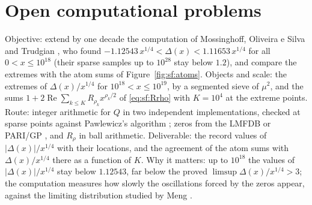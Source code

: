 \section{Open computational problems}

\begin{compproblem}\label{cp:sferror}
Objective: extend by one decade the computation of Mossinghoff, Oliveira e Silva and Trudgian \cite{mot2021}, who found $-1.12543\,x^{1/4}<\Delta(x)<1.11653\,x^{1/4}$ for all $0<x\le10^{18}$ (their sparse samples up to $10^{28}$ stay below $1.2$), and compare the extremes with the atom sums of Figure~\ref{fig:sf:atoms}. Objects and scale: the extremes of $\Delta(x)/x^{1/4}$ for $10^{18}<x\le10^{19}$, by a segmented sieve of $\mu^2$, and the sums $1+2\operatorname{Re}\sum_{k\le K}R_{\rho_k}x^{\rho_k/2}$ of \eqref{eq:sf:Rrho} with $K=10^4$ at the extreme points. Route: integer arithmetic for $Q$ in two independent implementations, checked at sparse points against Pawlewicz's algorithm \cite{pawlewicz2011}; zeros from the LMFDB \cite{lmfdb} or PARI/GP \cite{pari2023}, and $R_\rho$ in ball arithmetic. Deliverable: the record values of $|\Delta(x)|/x^{1/4}$ with their locations, and the agreement of the atom sums with $\Delta(x)/x^{1/4}$ there as a function of $K$. Why it matters: up to $10^{18}$ the values of $|\Delta(x)|/x^{1/4}$ stay below $1.12543$, far below the proved $\limsup\Delta(x)/x^{1/4}>3$; the computation measures how slowly the oscillations forced by the zeros appear, against the limiting distribution studied by Meng \cite{meng2017}.
\end{compproblem}

